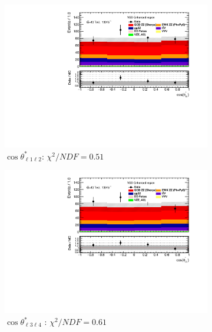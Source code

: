 \begin{figure}[!htbp]
    \centering
    \begin{subfigure}{.49\textwidth}
        \centering
        \includegraphics[width=.98\linewidth]{figures/Results/RecoDist_VBSEnhanced/reco_cosThetaStar1_SR.pdf}
        \caption{ \footnotesize{$\cos \theta^{*}_{\ell 1 \ell 2}$}: $\chi^2/NDF = 0.51$ }
    \end{subfigure}
    \begin{subfigure}{.49\textwidth}
        \centering
        \includegraphics[width=.98\linewidth]{figures/Results/RecoDist_VBSEnhanced/reco_cosThetaStar3_SR.pdf}
        \caption{ \footnotesize{$\cos \theta^{*}_{\ell 3 \ell 4}$ }: $\chi^2/NDF = 0.61$ }
    \end{subfigure}\\
    \begin{subfigure}{.49\textwidth}

\end{subfigure}
\end{figure}
